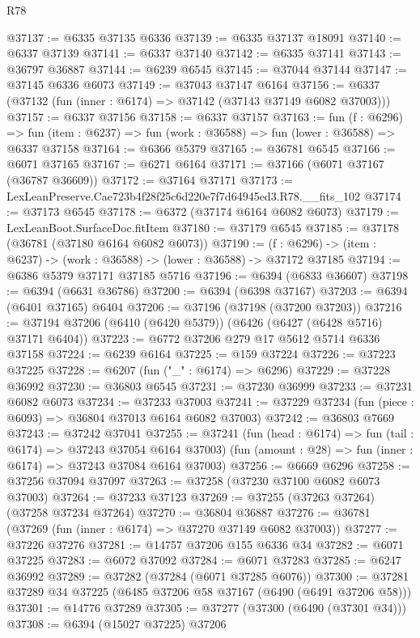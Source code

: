 \begin{lexlean}{R78}
\begin{coremodule}
@37137 := @6335 @37135 @6336
@37139 := @6335 @37137 @18091
@37140 := @6337 @37139
@37141 := @6337 @37140
@37142 := @6335 @37141
@37143 := @36797 @36887
@37144 := @6239 @6545
@37145 := @37044 @37144
@37147 := @37145 @6336 @6073
@37149 := @37043 @37147 @6164
@37156 := @6337 (@37132 (fun (inner : @6174) => @37142 (@37143 @37149 @6082 @37003)))
@37157 := @6337 @37156
@37158 := @6337 @37157
@37163 := fun (f : @6296) =>
  fun (item : @6237) => fun (work : @36588) => fun (lower : @36588) => @6337 @37158
@37164 := @6366 @5379
@37165 := @36781 @6545
@37166 := @6071 @37165
@37167 := @6271 @6164
@37171 := @37166 (@6071 @37167 (@36787 @36609))
@37172 := @37164 @37171
@37173 := LexLeanPreserve.Cae723b4f28f25c6d220e7f7d64945ed3.R78.__fits_102
@37174 := @37173 @6545
@37178 := @6372 (@37174 @6164 @6082 @6073)
@37179 := LexLeanBoot.SurfaceDoc.fitItem
@37180 := @37179 @6545
@37185 := @37178 (@36781 (@37180 @6164 @6082 @6073))
@37190 := (f : @6296) -> (item : @6237) -> (work : @36588) -> (lower : @36588) -> @37172 @37185
@37194 := @6386 @5379 @37171 @37185 @5716
@37196 := @6394 (@6833 @36607)
@37198 := @6394 (@6631 @36786)
@37200 := @6394 (@6398 @37167)
@37203 := @6394 (@6401 @37165) @6404
@37206 := @37196 (@37198 (@37200 @37203))
@37216 := @37194 @37206 (@6410 (@6420 @5379)) (@6426 (@6427 (@6428 @5716) @37171 @6404))
@37223 := @6772 @37206 @279 @17 @5612 @5714 @6336 @37158
@37224 := @6239 @6164
@37225 := @159 @37224
@37226 := @37223 @37225
@37228 := @6207 (fun ("_" : @6174) => @6296)
@37229 := @37228 @36992
@37230 := @36803 @6545
@37231 := @37230 @36999
@37233 := @37231 @6082 @6073
@37234 := @37233 @37003
@37241 := @37229 @37234 (fun (piece : @6093) => @36804 @37013 @6164 @6082 @37003)
@37242 := @36803 @7669
@37243 := @37242 @37041
@37255 := @37241
    (fun (head : @6174) => fun (tail : @6174) => @37243 @37054 @6164 @37003)
    (fun (amount : @28) => fun (inner : @6174) => @37243 @37084 @6164 @37003)
@37256 := @6669 @6296
@37258 := @37256 @37094 @37097
@37263 := @37258 (@37230 @37100 @6082 @6073 @37003)
@37264 := @37233 @37123
@37269 := @37255 (@37263 @37264) (@37258 @37234 @37264)
@37270 := @36804 @36887
@37276 := @36781 (@37269 (fun (inner : @6174) => @37270 @37149 @6082 @37003))
@37277 := @37226 @37276
@37281 := @14757 @37206 @155 @6336 @34
@37282 := @6071 @37225
@37283 := @6072 @37092
@37284 := @6071 @37283
@37285 := @6247 @36992
@37289 := @37282 (@37284 (@6071 @37285 @6076))
@37300 := @37281 @37289 @34 @37225 (@6485 @37206 @58 @37167 (@6490 (@6491 @37206 @58)))
@37301 := @14776 @37289
@37305 := @37277 (@37300 (@6490 (@37301 @34)))
@37308 := @6394 (@15027 @37225) @37206

\end{coremodule}
\end{lexlean}
